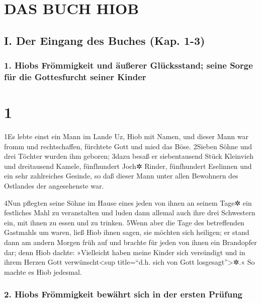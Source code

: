 \hypertarget{das-buch-hiob}{%
\section{DAS BUCH HIOB}\label{das-buch-hiob}}

\hypertarget{i.-der-eingang-des-buches-kap.-1-3}{%
\subsection{I. Der Eingang des Buches (Kap.
1-3)}\label{i.-der-eingang-des-buches-kap.-1-3}}

\hypertarget{hiobs-fruxf6mmigkeit-und-uxe4uuxdferer-gluxfccksstand-seine-sorge-fuxfcr-die-gottesfurcht-seiner-kinder}{%
\subsubsection{1. Hiobs Frömmigkeit und äußerer Glücksstand; seine Sorge
für die Gottesfurcht seiner
Kinder}\label{hiobs-fruxf6mmigkeit-und-uxe4uuxdferer-gluxfccksstand-seine-sorge-fuxfcr-die-gottesfurcht-seiner-kinder}}

\hypertarget{section}{%
\section{1}\label{section}}

1Es lebte einst ein Mann im Lande Uz, Hiob mit Namen, und dieser Mann
war fromm und rechtschaffen, fürchtete Gott und mied das Böse. 2Sieben
Söhne und drei Töchter wurden ihm geboren; 3dazu besaß er siebentausend
Stück Kleinvieh und dreitausend Kamele, fünfhundert Joch✲ Rinder,
fünfhundert Eselinnen und ein sehr zahlreiches Gesinde, so daß dieser
Mann unter allen Bewohnern des Ostlandes der angesehenste war.

4Nun pflegten seine Söhne im Hause eines jeden von ihnen an seinem Tage✲
ein festliches Mahl zu veranstalten und luden dann allemal auch ihre
drei Schwestern ein, mit ihnen zu essen und zu trinken. 5Wenn aber die
Tage des betreffenden Gastmahls um waren, ließ Hiob ihnen sagen, sie
möchten sich heiligen; er stand dann am andern Morgen früh auf und
brachte für jeden von ihnen ein Brandopfer dar; denn Hiob dachte:
»Vielleicht haben meine Kinder sich versündigt und in ihrem Herzen Gott
verwünscht\textless sup title=``d.h. sich von Gott
losgesagt''\textgreater✲.« So machte es Hiob jedesmal.

\hypertarget{hiobs-fruxf6mmigkeit-bewuxe4hrt-sich-in-der-ersten-pruxfcfung}{%
\subsubsection{2. Hiobs Frömmigkeit bewährt sich in der ersten
Prüfung}\label{hiobs-fruxf6mmigkeit-bewuxe4hrt-sich-in-der-ersten-pruxfcfung}}

